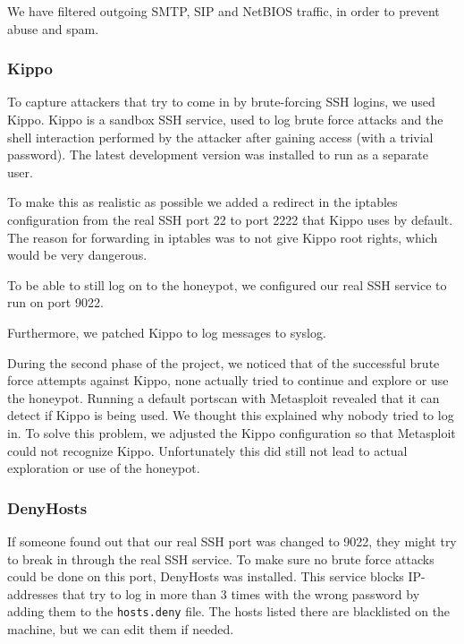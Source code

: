 \documentclass[11pt]{article}
\begin{document}
We have filtered outgoing SMTP, SIP and NetBIOS traffic, in order to prevent abuse and spam.

\subsubsection{Kippo}
To capture attackers that try to come in by brute-forcing SSH logins, we used Kippo. 
Kippo is a sandbox SSH service, used to log brute force attacks and the shell interaction performed by the attacker after gaining access (with a trivial password). 
The latest development version was installed to run as a separate user.

To make this as realistic as possible we added a redirect in the iptables configuration from the real SSH port 22 to port 2222 that Kippo uses by default.
The reason for forwarding in iptables was to not give Kippo root rights, which would be very dangerous.


To be able to still log on to the honeypot, we configured our real SSH service to run on port 9022.

Furthermore, we patched Kippo to log messages to syslog.

During the second phase of the project, we noticed that of the successful brute force attempts against Kippo, none actually tried to continue and explore or use the honeypot. Running a default portscan with Metasploit revealed that it can detect if Kippo is being used. We thought this explained why nobody tried to log in. To solve this problem, we adjusted the Kippo configuration so that Metasploit could not recognize Kippo. Unfortunately this did still not lead to actual exploration or use of the honeypot. 

\subsubsection{DenyHosts}
If someone found out that our real SSH port was changed to 9022, they might try to break in through the real SSH service.
To make sure no brute force attacks could be done on this port, DenyHosts was installed.
This service blocks IP-addresses that try to log in more than 3 times with the wrong password by adding them to the \verb|hosts.deny| file.
The hosts listed there are blacklisted on the machine, but we can edit them if needed.
\end{document}

